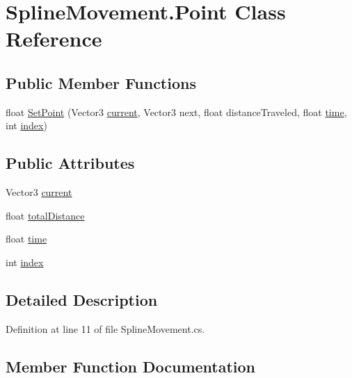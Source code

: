 \hypertarget{class_spline_movement_1_1_point}{}\section{Spline\+Movement.\+Point Class Reference}
\label{class_spline_movement_1_1_point}
\subsection*{Public Member Functions}
\begin{DoxyCompactItemize}
\item 
float \mbox{\hyperlink{class_spline_movement_1_1_point_ab4ff644fd187aad1b3b85e66771ea0f1}{Set\+Point}} (Vector3 \mbox{\hyperlink{class_spline_movement_1_1_point_a136b7b26549bbba4898b4f42f0c69222}{current}}, Vector3 next, float distance\+Traveled, float \mbox{\hyperlink{class_spline_movement_1_1_point_a2a8d6c1ba692ddada5db080549831d3c}{time}}, int \mbox{\hyperlink{class_spline_movement_1_1_point_a1060d9de3422a4fbdae9f7e316366cb3}{index}})
\end{DoxyCompactItemize}
\subsection*{Public Attributes}
\begin{DoxyCompactItemize}
\item 
Vector3 \mbox{\hyperlink{class_spline_movement_1_1_point_a136b7b26549bbba4898b4f42f0c69222}{current}}
\item 
float \mbox{\hyperlink{class_spline_movement_1_1_point_a02269ce5594bf2a1cd45a7a218d2b33e}{total\+Distance}}
\item 
float \mbox{\hyperlink{class_spline_movement_1_1_point_a2a8d6c1ba692ddada5db080549831d3c}{time}}
\item 
int \mbox{\hyperlink{class_spline_movement_1_1_point_a1060d9de3422a4fbdae9f7e316366cb3}{index}}
\end{DoxyCompactItemize}


\subsection{Detailed Description}


Definition at line 11 of file Spline\+Movement.\+cs.



\subsection{Member Function Documentation}
\mbox{\label{class_spline_movement_1_1_point_ab4ff644fd187aad1b3b85e66771ea0f1}} 
